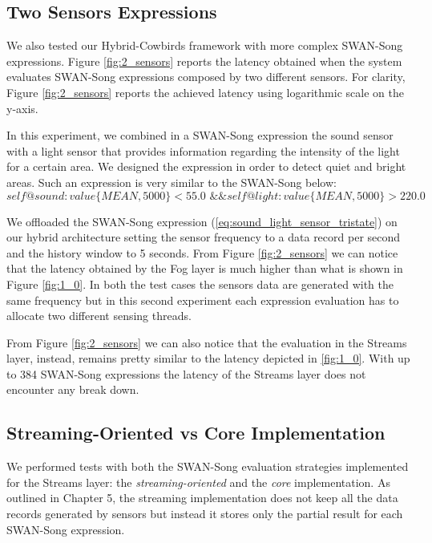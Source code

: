 \subsection{Two Sensors Expressions}
We also tested our Hybrid-Cowbirds framework with more complex SWAN-Song expressions. Figure \ref{fig:2_sensors} reports the latency obtained when the system evaluates SWAN-Song expressions composed by two different sensors. For clarity, Figure \ref{fig:2_sensors} reports the achieved latency using logarithmic scale on the y-axis. 

In this experiment, we combined in a SWAN-Song expression the sound sensor with a light sensor that provides information regarding the intensity of the light for a certain area. We designed the expression in order to detect quiet and bright areas. Such an expression is very similar to the SWAN-Song below:
\begin{equation}\label{eq:sound_light_sensor_tristate}
self@sound:value\big\{MEAN, 5000\big\} < 55.0  \text{ \&\& } self@light:value\big\{MEAN, 5000\big\}  > 220.0
\end{equation}

We offloaded the SWAN-Song expression (\ref{eq:sound_light_sensor_tristate}) on our hybrid architecture setting the sensor frequency to a data record per second and the history window to 5 seconds. From Figure \ref{fig:2_sensors} we can notice that the latency obtained by the Fog layer is much higher than what is shown in Figure \ref{fig:1_0}. In both the test cases the sensors data are generated with the same frequency but in this second experiment each expression evaluation has to allocate two different sensing threads.

From Figure \ref{fig:2_sensors} we can also notice that the evaluation in the Streams layer, instead, remains pretty similar to the latency depicted in \ref{fig:1_0}. With up to 384 SWAN-Song expressions the latency of the Streams layer does not encounter any break down.


\subsection{Streaming-Oriented vs Core Implementation}
We performed tests with both the SWAN-Song evaluation strategies implemented for the Streams layer: the \emph{streaming-oriented} and the \emph{core} implementation. As outlined in Chapter 5, the streaming implementation does not keep all the data records generated by sensors but instead it stores only the partial result for each SWAN-Song expression. 

